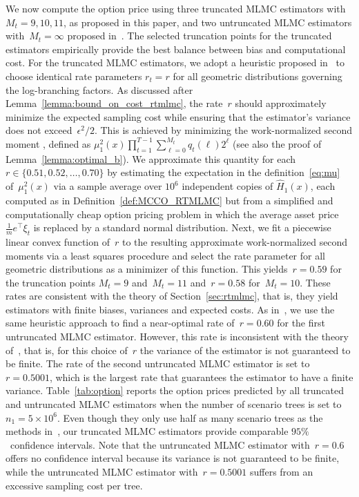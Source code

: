 \documentclass[11pt]{article}
\let\hat\widehat
\begin{document}
We now compute the option price using three truncated MLMC estimators with $M_t=9,10,11$, as proposed in this paper, and two untruncated MLMC estimators with~$M_t=\infty$ proposed in~\cite{zhou2022unbiased}. The selected truncation points for the truncated estimators empirically provide the best balance between bias and computational cost. For the truncated MLMC estimators, we adopt a heuristic proposed in~\cite{zhou2022unbiased} to choose identical rate parameters $r_t=r$ for all geometric distributions governing the log-branching factors. As discussed after Lemma~\ref{lemma:bound_on_cost_rtmlmc}, the rate~$r$ should approximately minimize the expected sampling cost while ensuring that the estimator's variance does not exceed~$\epsilon^2/2$. This is achieved by minimizing the work-normalized second moment \cite{blanchet2015unbiased}, defined as $\mu_1^2(x)\prod_{t=1}^{T-1}\sum_{\ell=0}^{M_t} q_t(\ell)2^\ell$ (see also the proof of Lemma~\ref{lemma:optimal_b}). We approximate this quantity for each $r\in\{0.51,0.52,\ldots,0.70\}$ by estimating the expectation in the definition~\eqref{eq:mu} of~$\mu_1^2(x)$ via a sample average over $10^6$ independent copies of $\hat H_1(x)$, each computed as in Definition~\ref{def:MCCO_RTMLMC} but from a simplified and computationally cheap option pricing problem in which the average asset price $\frac{1}{m}e^\top\xi_t$ is replaced by a standard normal distribution. Next, we fit a piecewise linear convex function of~$r$ to the resulting approximate work-normalized second moments via a least squares procedure and select the rate parameter for all geometric distributions as a minimizer of this function. This yields~$r=0.59$ for the truncation points $M_t=9$ and~$M_t=11$ and~$r=0.58$ for~$M_t=10$. These rates are consistent with the theory of Section~\ref{sec:rtmlmc}, that is, they yield estimators with finite biases, variances and expected costs. As in~\cite{zhou2022unbiased}, we use the same heuristic approach to find a near-optimal rate of~$r=0.60$ for the first untruncated MLMC estimator. However, this rate is inconsistent with the theory of~\cite{zhou2022unbiased}, that is, for this choice of~$r$ the variance of the estimator is not guaranteed to be finite. The rate of the second untruncated MLMC estimator is set to~$r=0.5001$, which is the largest rate that guarantees the estimator to have a finite variance. Table~\ref{tab:option} reports the option prices predicted by all truncated and untruncated MLMC estimators when the number of scenario trees is set to~$n_1=5\times 10^6$. Even though they only use half as many scenario trees as the methods in~\cite{bender2006policy, zhou2022unbiased}, our truncated MLMC estimators provide comparable $95\%$~confidence intervals. Note that the untruncated MLMC estimator with~$r=0.6$ offers no confidence interval because its variance is not guaranteed to be finite, while the untruncated MLMC estimator with~$r=0.5001$ suffers from an excessive sampling cost per tree. 
\end{document}
